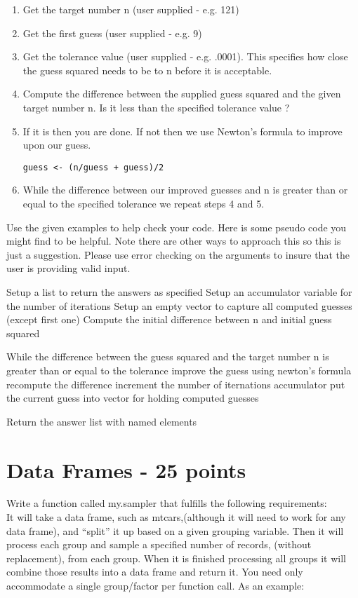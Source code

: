 \documentclass{article}
\begin{document}
\begin{enumerate}
\item Get the target number n (user supplied - e.g. 121)
\item Get the first guess (user supplied - e.g. 9)
\item Get the tolerance value (user supplied - e.g. .0001). This specifies how close the guess squared needs to be to n before it is acceptable. 
\item Compute the difference between the supplied guess squared and the given target number n. Is it less than the specified tolerance value ?
\item If it is then you are done. If not then we use Newton's formula to improve upon our guess. \begin{verbatim}guess <- (n/guess + guess)/2 \end{verbatim}
\item While the difference between our improved guesses and n is greater than or equal to the specified tolerance we repeat steps 4 and 5.
\end{enumerate}

Use the given examples to help check your code. Here is some pseudo code you might find to be helpful. Note there are other ways to approach this so this is just a suggestion. Please use error checking on the arguments to insure that the user is providing valid input. 

\begin{PseudoCode}
Setup a list to return the answers as specified
Setup an  accumulator variable for the number of iterations
Setup an empty vector to capture all computed guesses (except first one)
Compute the initial difference between n and initial guess squared 

While the difference between the guess squared and the target number n is 
greater than or equal to the tolerance
  improve the guess using newton's formula
  recompute the difference
  increment the number of iternations accumulator
  put the current guess into vector for holding computed guesses
  
Return the answer list with named elements

\end{PseudoCode}

\section{Data Frames - 25 points}Write a function called my.sampler that fulfills the following requirements:
\\
It will take a data frame, such as mtcars,(although it will need to work for any data frame), and ``split'' it up based on a given grouping variable. Then it will process each group and sample a specified number of records, (without replacement), from each group. When it is finished processing all groups it will combine those results into a data frame and return it. You need only accommodate a single group/factor per function call. As an example:
\end{document}

